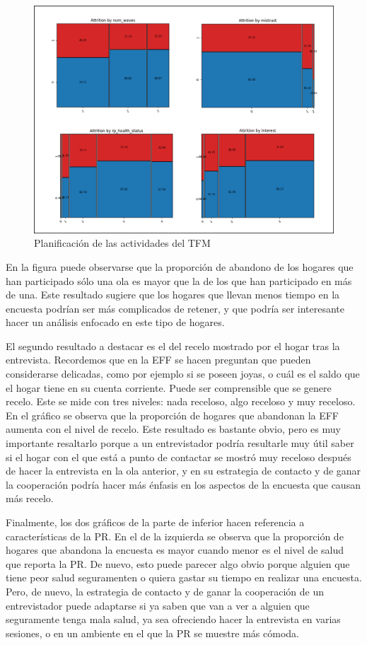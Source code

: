 \begin{figure}
	\centering
	\includegraphics[width=1\textwidth]{figs/categorical.png}
	\caption{Planificación de las actividades del TFM}
	\label{fig:gantt}
\end{figure}

En la figura puede observarse que la proporción de abandono de los hogares que han participado sólo una ola es mayor que la de los que han participado en más de una. Este resultado sugiere que los hogares que llevan menos tiempo en la encuesta podrían ser más complicados de retener, y que podría ser interesante hacer un análisis enfocado en este tipo de hogares.

El segundo resultado a destacar es el del recelo mostrado por el hogar tras la entrevista. Recordemos que en la EFF se hacen preguntan que pueden considerarse delicadas, como por ejemplo si se poseen joyas, o cuál es el saldo que el hogar tiene en su cuenta corriente. Puede ser comprensible que se genere recelo. Este se mide con tres niveles: nada receloso, algo receloso y muy receloso. En el gráfico se observa que la proporción de hogares que abandonan la EFF aumenta con el nivel de recelo. Este resultado es bastante obvio, pero es muy importante resaltarlo porque a un entrevistador podría resultarle muy útil saber si el hogar con el que está a punto de contactar se mostró muy receloso después de hacer la entrevista en la ola anterior, y en su estrategia de contacto y de ganar la cooperación podría hacer más énfasis en los aspectos de la encuesta que causan más recelo.

Finalmente, los dos gráficos de la parte de inferior hacen referencia a características de la PR. En el de la izquierda se observa que la proporción de hogares que abandona la encuesta es mayor cuando menor es el nivel de salud que reporta la PR. De nuevo, esto puede parecer algo obvio porque alguien que tiene peor salud seguramenten o quiera gastar su tiempo en realizar una encuesta. Pero, de nuevo, la estrategia de contacto y de ganar la cooperación de un entrevistador puede adaptarse si ya saben que van a ver a alguien que seguramente tenga mala salud, ya sea ofreciendo hacer la entrevista en varias sesiones, o en un ambiente en el que la PR se muestre más cómoda.


